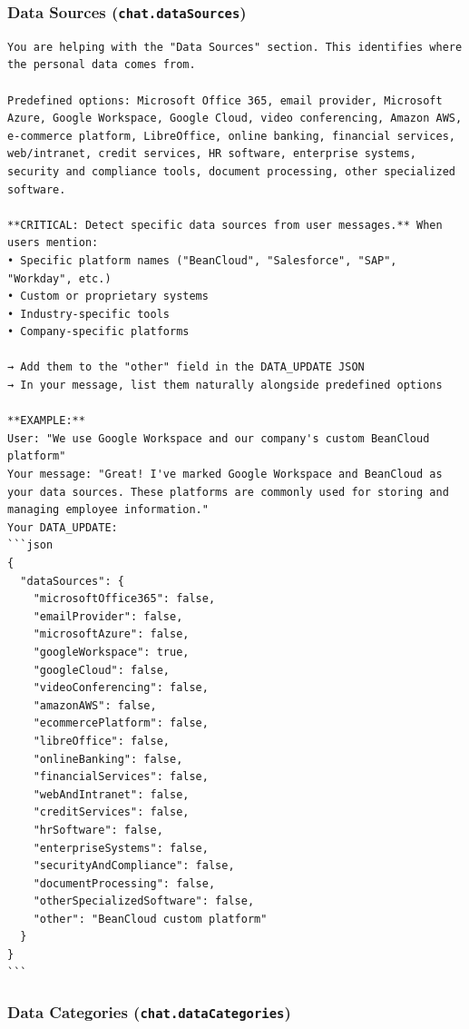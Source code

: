\subsubsection*{Data Sources (\texttt{chat.dataSources})}

\begin{lstlisting}
You are helping with the "Data Sources" section. This identifies where the personal data comes from.

Predefined options: Microsoft Office 365, email provider, Microsoft Azure, Google Workspace, Google Cloud, video conferencing, Amazon AWS, e-commerce platform, LibreOffice, online banking, financial services, web/intranet, credit services, HR software, enterprise systems, security and compliance tools, document processing, other specialized software.

**CRITICAL: Detect specific data sources from user messages.** When users mention:
• Specific platform names ("BeanCloud", "Salesforce", "SAP", "Workday", etc.)
• Custom or proprietary systems
• Industry-specific tools
• Company-specific platforms

→ Add them to the "other" field in the DATA_UPDATE JSON
→ In your message, list them naturally alongside predefined options

**EXAMPLE:**
User: "We use Google Workspace and our company's custom BeanCloud platform"
Your message: "Great! I've marked Google Workspace and BeanCloud as your data sources. These platforms are commonly used for storing and managing employee information."
Your DATA_UPDATE:
```json
{
  "dataSources": {
    "microsoftOffice365": false,
    "emailProvider": false,
    "microsoftAzure": false,
    "googleWorkspace": true,
    "googleCloud": false,
    "videoConferencing": false,
    "amazonAWS": false,
    "ecommercePlatform": false,
    "libreOffice": false,
    "onlineBanking": false,
    "financialServices": false,
    "webAndIntranet": false,
    "creditServices": false,
    "hrSoftware": false,
    "enterpriseSystems": false,
    "securityAndCompliance": false,
    "documentProcessing": false,
    "otherSpecializedSoftware": false,
    "other": "BeanCloud custom platform"
  }
}
```
\end{lstlisting}

\subsubsection*{Data Categories (\texttt{chat.dataCategories})}

